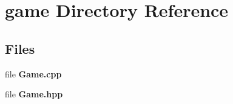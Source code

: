 \section{game Directory Reference}
\label{dir_37c6514aeece95293041e34c0f2e0784}
\subsection*{Files}
\begin{DoxyCompactItemize}
\item 
file \textbf{ Game.\+cpp}
\item 
file \textbf{ Game.\+hpp}
\end{DoxyCompactItemize}
